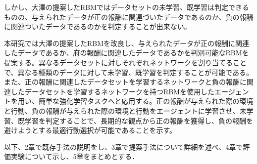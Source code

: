 しかし、大澤の提案したRBMではデータセットの未学習、既学習は判定できるものの、与えられたデータが正の報酬に関連づいたデータであるのか、負の報酬に関連ついたデータであるのかを判定することが出来ない。

本研究では大澤の提案したRBMを改良し、与えられたデータが正の報酬に関連したデータであるか、府の報酬に関連したデータであるかを判別可能なRBMを提案する。異なるデータセットに対しそれぞれネットワークを割り当てることで、異なる種類のデータに対して未学習、既学習を判定することが可能である。また、正の報酬に関連したデータセットを学習するネットワークと負の報酬に関連したデータセットを学習するネットワークを持つRBMを使用したエージェントを用い、簡単な強化学習タスクへと応用する。正の報酬が与えられた際の環境と行動、負の報酬が与えられた際の環境と行動をエージェントに学習させ、未学習、既学習を判定することで、長期的な観点から正の報酬を獲得し、負の報酬を避けようとする最適行動選択が可能であることを示す。

以下、2章で既存手法の説明をし、3章で提案手法について詳細を述べ、4章で評価実験について示し、5章をまとめとする．

